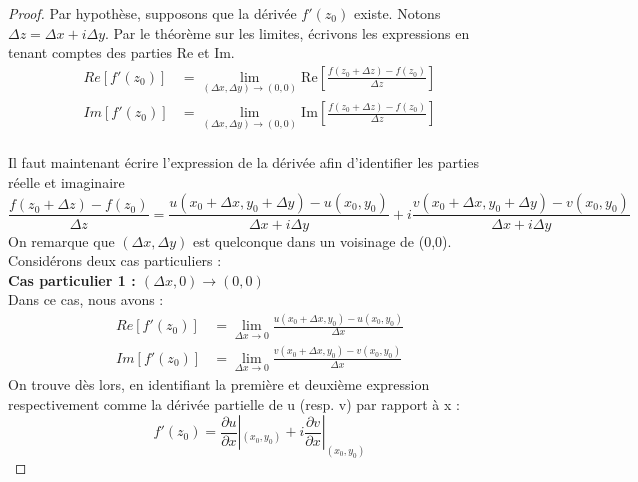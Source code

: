     
    \begin{proof}
    Par hypothèse, supposons que la dérivée $f'(z_0)$ existe. Notons $\Delta z = \Delta x +i\Delta y$.
    Par le théorème sur les limites, écrivons les expressions en tenant comptes des parties Re et Im.
    \begin{equation}
    \begin{array}{ll}
     Re[f'(z_0)] &=  \lim\limits_{(\Delta x,\Delta y) \rightarrow (0,0)} \text{Re}\left[\frac{f(z_0+\Delta z) - f(z_0)}{\Delta z} \right]\\
     Im[f'(z_0)] &=  \lim\limits_{(\Delta x,\Delta y) \rightarrow (0,0)} \text{Im}\left[\frac{f(z_0+\Delta z) - f(z_0)}{\Delta z} \right]\\
    \end{array}
    \end{equation}
    
    Il faut maintenant écrire l'expression de la dérivée afin d'identifier les parties réelle
    et imaginaire
    \begin{equation}
    \frac{f(z_0+\Delta z)-f(z_0)}{\Delta z} = \frac{u(x_0+\Delta x, y_0 + \Delta y) - u(x_0, y_0)}{\Delta x + i\Delta y}
    + i \frac{v(x_0+\Delta x, y_0 + \Delta y) - v(x_0,y_0)}{\Delta x + i\Delta y}
    \end{equation}
    On remarque que $(\Delta x, \Delta y)$ est quelconque dans un voisinage de (0,0). Considérons
    deux cas particuliers :\\
    
    \textbf{Cas particulier 1 : $(\Delta x, 0) \rightarrow (0,0)$}\\
    Dans ce cas, nous avons :
    \begin{equation}
    \begin{array}{ll}
     Re[f'(z_0)] &= \lim\limits_{\Delta x\rightarrow 0} \frac{u(x_0+\Delta x, y_0) - u(x_0, y_0)}{\Delta x}\\
     Im[f'(z_0)] &= \lim\limits_{\Delta x\rightarrow 0} \frac{v(x_0+\Delta x, y_0) - v(x_0, y_0)}{\Delta x}
    \end{array}
    \end{equation}
    On trouve dès lors, en identifiant la première et deuxième expression respectivement comme la dérivée
    partielle de u (resp. v) par rapport à x :
    \begin{equation}
    f'(z_0) = \frac{\partial u}{\partial x}|_{(x_0,y_0)} + i \frac{\partial v}{\partial x}|_{(x_0,y_0)} 
    \end{equation}
    

\end{proof}
